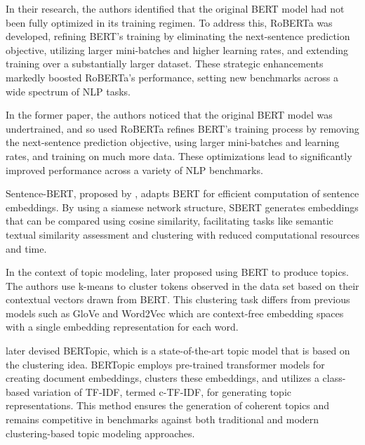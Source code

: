 \documentclass{article}
\begin{document}
In their research, the authors identified that the original BERT model had not been fully optimized in its training regimen. To address this, RoBERTa was developed, refining BERT’s training by eliminating the next-sentence prediction objective, utilizing larger mini-batches and higher learning rates, and extending training over a substantially larger dataset. These strategic enhancements markedly boosted RoBERTa’s performance, setting new benchmarks across a wide spectrum of NLP tasks.

In the former paper, the authors noticed that the original BERT model was undertrained, and so used RoBERTa refines BERT's training process by removing the next-sentence prediction objective, using larger mini-batches and learning rates, and training on much more data. These optimizations lead to significantly improved performance across a variety of NLP benchmarks.

Sentence-BERT, proposed by \citet{reimers_sentence-bert_2019}, adapts BERT for efficient computation of sentence embeddings. By using a siamese network structure, SBERT generates embeddings that can be compared using cosine similarity, facilitating tasks like semantic textual similarity assessment and clustering with reduced computational resources and time.

In the context of topic modeling, \citet{thompson_topic_2020} later proposed using BERT \cite{devlin_bert_2019} to produce topics. The authors use k-means to cluster tokens observed in the data set based on their contextual vectors drawn from BERT. This clustering task differs from previous models such as GloVe \cite{pennington_glove_2014} and Word2Vec which are context-free embedding spaces with a single embedding representation for each word.


\citet{grootendorst_bertopic_2022} later devised BERTopic, which is a state-of-the-art topic model that is based on the clustering idea. BERTopic employs pre-trained transformer models for creating document embeddings, clusters these embeddings, and utilizes a class-based variation of TF-IDF, termed c-TF-IDF, for generating topic representations. This method ensures the generation of coherent topics and remains competitive in benchmarks against both traditional and modern clustering-based topic modeling approaches.




\end{document}
